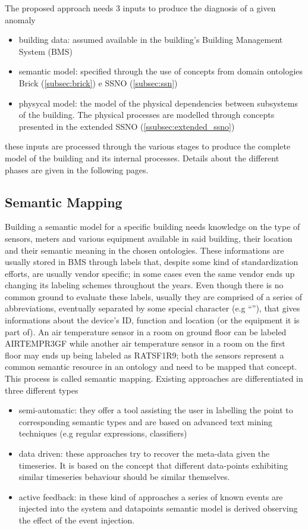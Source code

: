 The proposed approach needs 3 inputs to produce the diagnosis of a given anomaly
\begin{itemize}
  \item building data: assumed available in the building's Building Management System (BMS)
  \item semantic model: specified through the use of concepts from domain ontologies Brick (\autoref{subsec:brick}) e SSNO (\autoref{subsec:ssn})
  \item physycal model: the model of the physical dependencies between subsystems of the building. The physical processes are modelled through concepts presented in the extended SSNO (\autoref{ssubsec:extended_ssno})
\end{itemize}
these inputs are processed through the various stages to produce the complete model of the building and its internal processes. Details about the different phases are given in the following pages.

\subsection{Semantic Mapping}
Building a semantic model for a specific building needs knowledge on the type of sensors, meters and various equipment available in said building, their location and their semantic meaning in the chosen ontologies. These informations are usually stored in BMS through labels that, despite some kind of standardization efforts, are usually vendor specific; in some cases even the same vendor ends up changing its labeling schemes throughout the years. Even though there is no common ground to evaluate these labels, usually they are comprised of a series of abbreviations, eventually separated by some special character (e.g ``\textunderscore''), that gives informations about the device's ID, function and location (or the equipment it is part of). An air temperature sensor in a room on ground floor can be labeled AIR\textunderscore TEMP\textunderscore R3GF while another air temperature sensor in a room on the first floor may ends up being labeled as RATSF1R9; both the sensors represent a common semantic resource in an ontology and need to be mapped that concept. This process is called semantic mapping. Existing approaches are differentiated in three different types \cite{semantic_mapping}
\begin{itemize}
  \item semi-automatic: they offer a tool assisting the user in labelling the point to corresponding semantic types and are based on advanced text mining techniques (e.g regular expressions, classifiers)
  \item data driven: these approaches try to recover the meta-data given the timeseries. It is based on the concept that different data-points exhibiting similar timeseries behaviour should be similar themselves.
  \item active feedback: in these kind of approaches a series of known events are injected into the system and datapoints semantic model is derived observing the effect of the event injection.
\end{itemize}

